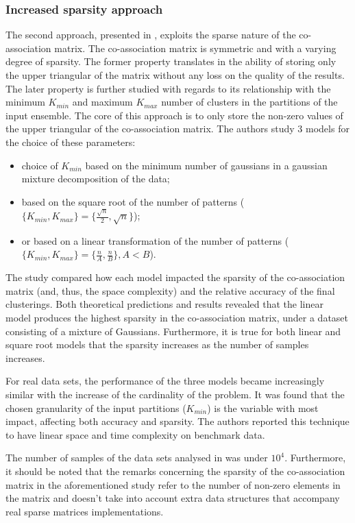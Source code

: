 \subsubsection{Increased sparsity approach}
The second approach, presented in \cite{Lourenco2010}, exploits the sparse nature of the co-association matrix.
The co-association matrix is symmetric and with a varying degree of sparsity.
The former property translates in the ability of storing only the upper triangular of the matrix without any loss on the quality of the results.
The later property is further studied with regards to its relationship with the minimum $K_{min}$ and maximum $K_{max}$ number of clusters in the partitions of the input ensemble.
The core of this approach is to only store the non-zero values of the upper triangular of the co-association matrix.
The authors study 3 models for the choice of these parameters:

\begin{itemize}
	\item choice of $K_{min}$ based on the minimum number of gaussians in a gaussian mixture decomposition of the data;
	\item based on the square root of the number of patterns ($\{K_{min},K_{max}\} = \{\frac{\sqrt{n}}{2},\sqrt{n}\}$);
	\item or based on a linear transformation of the number of patterns ($\{K_{min},K_{max}\} = \{\frac{n}{A},\frac{n}{B}\},A<B$).
\end{itemize}

The study compared how each model impacted the sparsity of the co-association matrix (and, thus, the space complexity) and the relative accuracy of the final clusterings.
Both theoretical predictions and results revealed that the linear model produces the highest sparsity in the co-association matrix, under a dataset consisting of a mixture of Gaussians.
Furthermore, it is true for both linear and square root models that the sparsity increases as the number of samples increases.

For real data sets, the performance of the three models became increasingly similar with the increase of the cardinality of the problem.
It was found that the chosen granularity of the input partitions ($K_{min}$) is the variable with most impact, affecting both accuracy and sparsity.
The authors reported this technique to have linear space and time complexity on benchmark data.

The number of samples of the data sets analysed in \cite{Lourenco2010} was under $10^4$.
Furthermore, it should be noted that the remarks concerning the sparsity of the co-association matrix in the aforementioned study refer to the number of non-zero elements in the matrix and doesn't take into account extra data structures that accompany real sparse matrices implementations.

